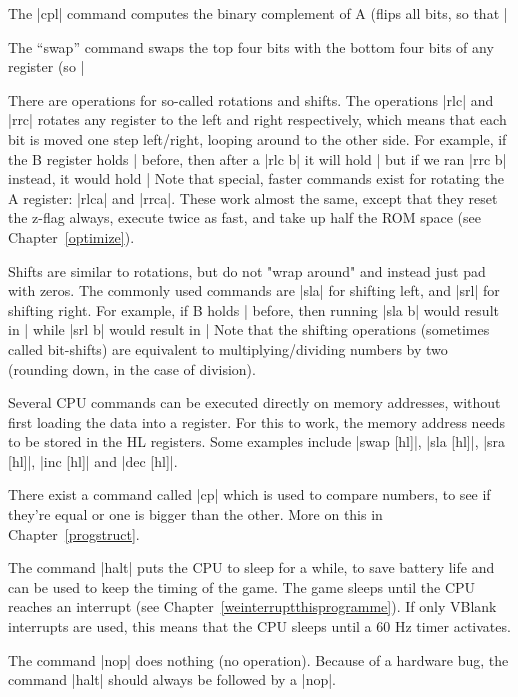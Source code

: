 \documentclass[11pt]{book}
\begin{document}
The |cpl| command computes the binary complement of A (flips all bits, so that |%

The “swap” command swaps the top four bits with the bottom four bits of any register (so |%

There are operations for so-called rotations and shifts. The operations |rlc| and |rrc| rotates any register to the left and right respectively, which means that each bit is moved one step left/right, looping around to the other side. For example, if the B register holds |%
before, then after a |rlc b| it will hold |%
but if we ran |rrc b| instead, it would hold |%
Note that special, faster commands exist for rotating the A register: |rlca| and |rrca|. These work almost the same, except that they reset the z-flag always, execute twice as fast, and take up half the ROM space (see Chapter~\ref{optimize}). 

Shifts are similar to rotations, but do not "wrap around" and instead just pad with zeros. The commonly used commands are |sla| for shifting left, and |srl| for shifting right. For example, if B holds |%
before, then running |sla b| would result in |%
while |srl b| would result in |%
Note that the shifting operations (sometimes called bit-shifts) are equivalent to multiplying/dividing numbers by two (rounding down, in the case of division). 

Several CPU commands can be executed directly on memory addresses, without first loading the data into a register. For this to work, the memory address needs to be stored in the HL registers. Some examples include |swap [hl]|, |sla [hl]|, |sra [hl]|, |inc [hl]| and |dec [hl]|.

There exist a command called |cp| which is used to compare numbers, to see if they're equal or one is bigger than the other. More on this in Chapter~\ref{progstruct}.

The command |halt| puts the CPU to sleep for a while, to save battery life and can be used to keep the timing of the game. The game sleeps until the CPU reaches an interrupt (see Chapter~\ref{weinterruptthisprogramme}). If only VBlank interrupts are used, this means that the CPU sleeps until a 60 Hz timer activates.

The command |nop| does nothing (no operation). Because of a hardware bug, the command |halt| should always be followed by a |nop|.
\end{document}
